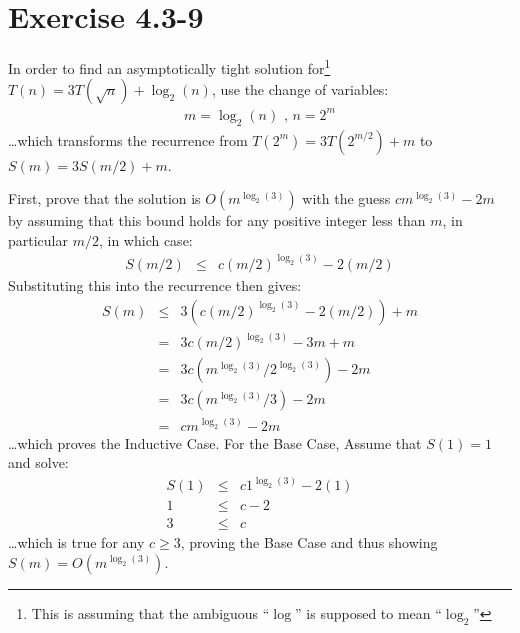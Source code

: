 \documentclass{article}
\begin{document}
\section*{Exercise 4.3-9}

In order to find an asymptotically tight solution for\footnote{This is assuming that the ambiguous ``$\log$'' is supposed to mean ``$\log_2$''} $T(n) = 3T(\sqrt{n}) + \log_2(n)$, use the change of variables:
\begin{eqnarray*}
	m = \log_2(n) \text{ , } n = 2^m
\end{eqnarray*}
\ldots which transforms the recurrence from $T(2^m) = 3T(2^{m/2}) + m$ to $S(m) = 3S(m/2) + m$.

First, prove that the solution is $O(m^{\log_2(3)})$ with the guess $cm^{\log_2(3)} - 2m$ by assuming that this bound holds for any positive integer less than $m$, in particular $m/2$, in which case:
\begin{eqnarray*}
	S(m/2) &\leq& c(m/2)^{\log_2(3)} - 2(m/2)
\end{eqnarray*}
Substituting this into the recurrence then gives:
\begin{eqnarray*}
	S(m) &\leq& 3(c(m/2)^{\log_2(3)} - 2(m/2)) + m \\
	 &=& 3c(m/2)^{\log_2(3)} - 3m + m \\
	 &=& 3c(m^{\log_2(3)}/2^{\log_2(3)}) - 2m \\
	 &=& 3c(m^{\log_2(3)}/3) - 2m \\
	 &=& cm^{\log_2(3)} - 2m
\end{eqnarray*}
\ldots which proves the Inductive Case.  For the Base Case, Assume that $S(1) = 1$ and solve:
\begin{eqnarray*}
	S(1) &\leq& c1^{\log_2(3)} - 2(1) \\
	1 &\leq& c - 2 \\
	3 &\leq& c
\end{eqnarray*}
\ldots which is true for any $c \geq 3$, proving the Base Case and thus showing $S(m) = O(m^{\log_2(3)})$.
\end{document}
